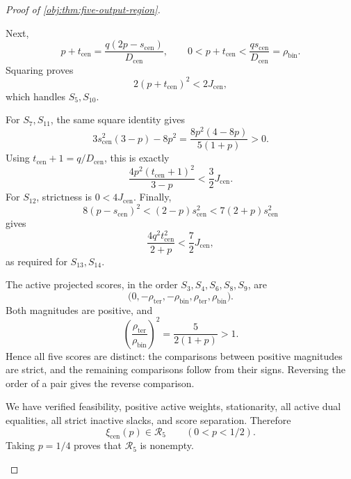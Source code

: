 \documentclass[11pt]{article}
\begin{document}
\begin{proof}[Proof of \cref{obj:thm:five-output-region}]
\begin{enumerate}
Next,
\[
p+t_{\mathrm{cen}}
=\frac{q(2p-s_{\mathrm{cen}})}{D_{\mathrm{cen}}},
\qquad
0<p+t_{\mathrm{cen}}<\frac{qs_{\mathrm{cen}}}{D_{\mathrm{cen}}}
=\rho_{\mathrm{bin}}.
\]
Squaring proves
\[
2(p+t_{\mathrm{cen}})^2<2J_{\mathrm{cen}},
\]
which handles \(S_5,S_{10}\).

For \(S_7,S_{11}\), the same square identity gives
\[
3s_{\mathrm{cen}}^2(3-p)-8p^2
=
\frac{8p^2(4-8p)}{5(1+p)}>0.
\]
Using \(t_{\mathrm{cen}}+1=q/D_{\mathrm{cen}}\), this is exactly
\[
\frac{4p^2(t_{\mathrm{cen}}+1)^2}{3-p}
<
\frac32J_{\mathrm{cen}}.
\]
For \(S_{12}\), strictness is \(0<4J_{\mathrm{cen}}\).
Finally,
\[
8(p-s_{\mathrm{cen}})^2
<
(2-p)s_{\mathrm{cen}}^2
<
7(2+p)s_{\mathrm{cen}}^2
\]
gives
\[
\frac{4q^2t_{\mathrm{cen}}^2}{2+p}
<
\frac72J_{\mathrm{cen}},
\]
as required for \(S_{13},S_{14}\).

The active projected scores, in the order \(S_3,S_4,S_6,S_8,S_9\), are
\[
\bigl(0,-\rho_{\mathrm{ter}},-\rho_{\mathrm{bin}},
          \rho_{\mathrm{ter}},\rho_{\mathrm{bin}}\bigr).
\]
Both magnitudes are positive, and
\[
\left(\frac{\rho_{\mathrm{ter}}}{\rho_{\mathrm{bin}}}\right)^2
=
\frac{5}{2(1+p)}>1.
\]
Hence all five scores are distinct: the comparisons between positive
magnitudes are strict, and the remaining comparisons follow from their
signs. Reversing the order of a pair gives the reverse comparison.

We have verified feasibility, positive active weights, stationarity,
all active dual equalities, all strict inactive slacks, and score
separation. Therefore
\[
\xi_{\mathrm{cen}}(p)\in\mathcal R_5
\qquad(0<p<1/2).
\]
Taking \(p=1/4\) proves that \(\mathcal R_5\) is nonempty.


\end{enumerate}
\end{proof}
\end{document}
